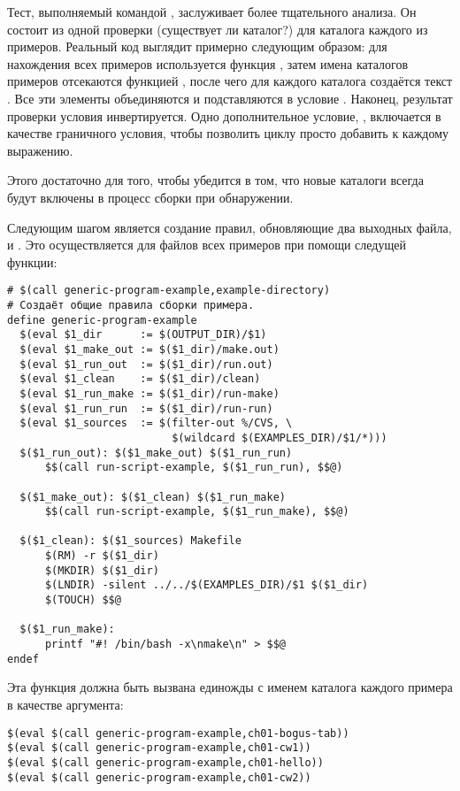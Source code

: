 Тест, выполняемый командой , заслуживает более тщательного
анализа. Он состоит из одной проверки  (существует ли
каталог?) для каталога каждого из примеров. Реальный код выглядит
примерно следующим образом: для нахождения всех примеров используется
функция , затем имена каталогов примеров отсекаются
функцией , после чего для каждого каталога создаётся
текст . Все эти
элементы объединяются и подставляются в условие . Наконец, результат проверки условия
инвертируется. Одно дополнительное условие, , включается
в качестве граничного условия, чтобы позволить циклу
 просто добавить \command{\&\&} к каждому выражению.

Этого достаточно для того, чтобы убедится в том, что новые каталоги
всегда будут включены в процесс сборки при обнаружении.

Следующим шагом является создание правил, обновляющие два выходных
файла,  и . Это осуществляется
для  файлов всех примеров при помощи следущей функции:

\begin{verbatim}
# $(call generic-program-example,example-directory)
# Создаёт общие правила сборки примера.
define generic-program-example
  $(eval $1_dir      := $(OUTPUT_DIR)/$1)
  $(eval $1_make_out := $($1_dir)/make.out)
  $(eval $1_run_out  := $($1_dir)/run.out)
  $(eval $1_clean    := $($1_dir)/clean)
  $(eval $1_run_make := $($1_dir)/run-make)
  $(eval $1_run_run  := $($1_dir)/run-run)
  $(eval $1_sources  := $(filter-out %/CVS, \
                          $(wildcard $(EXAMPLES_DIR)/$1/*)))
  $($1_run_out): $($1_make_out) $($1_run_run)
      $$(call run-script-example, $($1_run_run), $$@)

  $($1_make_out): $($1_clean) $($1_run_make)
      $$(call run-script-example, $($1_run_make), $$@)

  $($1_clean): $($1_sources) Makefile
      $(RM) -r $($1_dir)
      $(MKDIR) $($1_dir)
      $(LNDIR) -silent ../../$(EXAMPLES_DIR)/$1 $($1_dir)
      $(TOUCH) $$@

  $($1_run_make):
      printf "#! /bin/bash -x\nmake\n" > $$@
endef
\end{verbatim}

Эта функция должна быть вызвана единожды с именем каталога каждого
примера в качестве аргумента:

\begin{verbatim}
$(eval $(call generic-program-example,ch01-bogus-tab))
$(eval $(call generic-program-example,ch01-cw1))
$(eval $(call generic-program-example,ch01-hello))
$(eval $(call generic-program-example,ch01-cw2))
\end{verbatim}

